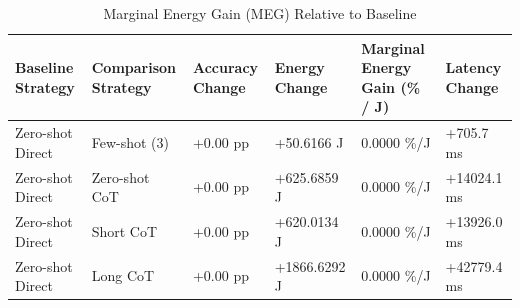 \begin{table}
\caption{Marginal Energy Gain (MEG) Relative to Baseline}
\label{tab:marginal_energy_gain}
\begin{tabular}{llllll}
\toprule
Baseline Strategy & Comparison Strategy & Accuracy Change & Energy Change & Marginal Energy Gain (\% / J) & Latency Change \\
\midrule
Zero-shot Direct & Few-shot (3) & +0.00 pp & +50.6166 J & 0.0000 \%/J & +705.7 ms \\
Zero-shot Direct & Zero-shot CoT & +0.00 pp & +625.6859 J & 0.0000 \%/J & +14024.1 ms \\
Zero-shot Direct & Short CoT & +0.00 pp & +620.0134 J & 0.0000 \%/J & +13926.0 ms \\
Zero-shot Direct & Long CoT & +0.00 pp & +1866.6292 J & 0.0000 \%/J & +42779.4 ms \\
\bottomrule
\end{tabular}
\end{table}
